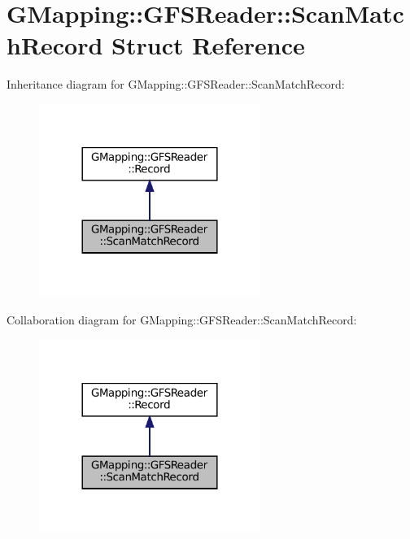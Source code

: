\hypertarget{structGMapping_1_1GFSReader_1_1ScanMatchRecord}{}\section{G\+Mapping\+:\+:G\+F\+S\+Reader\+:\+:Scan\+Match\+Record Struct Reference}
\label{structGMapping_1_1GFSReader_1_1ScanMatchRecord}


Inheritance diagram for G\+Mapping\+:\+:G\+F\+S\+Reader\+:\+:Scan\+Match\+Record\+:
\nopagebreak
\begin{figure}[H]
\begin{center}
\leavevmode
\includegraphics[width=204pt]{structGMapping_1_1GFSReader_1_1ScanMatchRecord__inherit__graph}
\end{center}
\end{figure}


Collaboration diagram for G\+Mapping\+:\+:G\+F\+S\+Reader\+:\+:Scan\+Match\+Record\+:
\nopagebreak
\begin{figure}[H]
\begin{center}
\leavevmode
\includegraphics[width=204pt]{structGMapping_1_1GFSReader_1_1ScanMatchRecord__coll__graph}
\end{center}
\end{figure}
